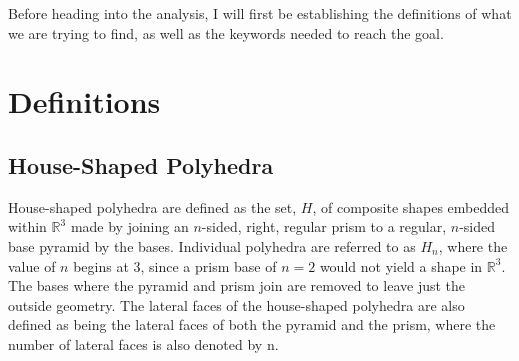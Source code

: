\documentclass[12 pt]{article}
\begin{document}
	Before heading into the analysis, I will first be establishing the definitions of what we are trying to find, as well as the keywords needed to reach the goal.

\section{Definitions}

\subsection*{House-Shaped Polyhedra}
House-shaped polyhedra are defined as the set, $H$, of composite shapes embedded within $\mathbb{R}^3$ made by joining an $n$-sided, right, regular prism to a regular, $n$-sided base pyramid by the bases. Individual polyhedra are referred to as $H_n$, where the value of $n$  begins at 3, since a prism base of $n=2$ would not yield a shape in $\mathbb{R}^3$. The bases where the pyramid and prism join are removed to leave just the outside geometry. The lateral faces of the house-shaped polyhedra are also defined as being the lateral faces of both the pyramid and the prism, where the number of lateral faces is also denoted by n.
\end{document}
